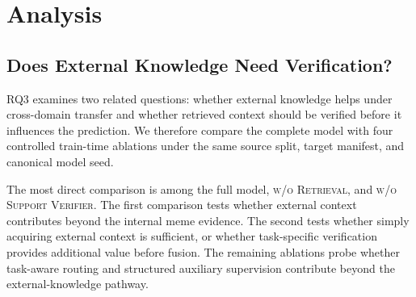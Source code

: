 \section{Analysis}
\label{sec:analysis}

\subsection{Does External Knowledge Need Verification?}
\label{sec:analysis:verification}

RQ3 examines two related questions: whether external knowledge helps under
cross-domain transfer and whether retrieved context should be verified
before it influences the prediction.
We therefore compare the complete model with four controlled train-time
ablations under the same source split, target manifest, and canonical model
seed.

\begin{table}[t]
    \caption{
    Controlled component ablations on held-out FHM.
    All variants use the canonical seed 42 and are interpreted as diagnostic
    comparisons rather than multi-seed significance estimates.
    }
    \label{tab:ablations}
    \centering
    \renewcommand{\arraystretch}{1.18}
    
\end{table}

The most direct comparison is among the full model,
\textsc{w/o Retrieval}, and \textsc{w/o Support Verifier}.
The first comparison tests whether external context contributes beyond the
internal meme evidence.
The second tests whether simply acquiring external context is sufficient,
or whether task-specific verification provides additional value before
fusion.
The remaining ablations probe whether task-aware routing and structured
auxiliary supervision contribute beyond the external-knowledge pathway.

%
%
%
%

